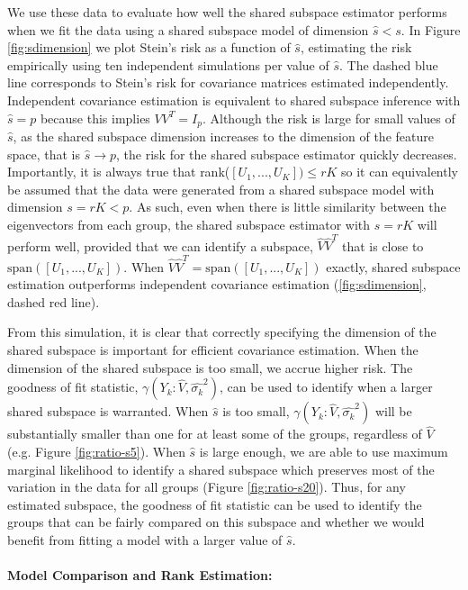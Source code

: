 \documentclass{statsoc}
\begin{document}
We use these data to evaluate how well the shared subspace estimator
performs when we fit the data using a shared subspace model of
dimension $\hat{s} < s$.  In Figure \ref{fig:sdimension} we plot
Stein's risk as a function of $\hat{s}$, estimating the risk
empirically using ten independent simulations per value of $\hat{s}$.
The dashed blue line corresponds to Stein's risk for covariance
matrices estimated independently.  Independent covariance estimation
is equivalent to shared subspace inference with $\hat{s} = p$ because
this implies $VV^T = I_p$.  Although the risk is large for small
values of $\hat{s}$, as the shared subspace dimension increases to the
dimension of the feature space, that is $\hat{s} \rightarrow p$, the
risk for the shared subspace estimator quickly decreases.
Importantly, it is always true that rank($[U_1, ..., U_K]) \leq rK$ so
it can equivalently be assumed that the data were generated from a
shared subspace model with dimension $s = rK < p$.  As such, even when
there is little similarity between the eigenvectors from each group,
the shared subspace estimator with $\hat{s} = rK$ will perform well,
provided that we can identify a subspace, $\hat{V}\hat{V}^T$ that is
close to $\text{span}([U_1, ..., U_K])$. When
$\hat{V}\hat{V}^T = \text{span}([U_1, ..., U_K])$ exactly, shared
subspace estimation outperforms independent covariance estimation
(\ref{fig:sdimension}, dashed red line).

From this simulation, it is clear that correctly specifying the
dimension of the shared subspace is important for efficient covariance
estimation.  When the dimension of the shared subspace is too small,
we accrue higher risk.  The goodness of fit statistic,
$\gamma(Y_k: \hat{V}, \hat{\sigma_k}^2)$, can be used to identify when
a larger shared subspace is warranted.  When $\hat{s}$ is too small,
$\gamma(Y_k: \hat{V}, \hat{\sigma_k}^2)$ will be substantially smaller
than one for at least some of the groups, regardless of $\hat{V}$
(e.g. Figure \ref{fig:ratio-s5}).  When $\hat{s}$ is large enough, we
are able to use maximum marginal likelihood to identify a shared
subspace which preserves most of the variation in the data for all
groups (Figure \ref{fig:ratio-s20}).  Thus, for any estimated
subspace, the goodness of fit statistic can be used to identify the
groups that can be fairly compared on this subspace and whether we
would benefit from fitting a model with a larger value of $\hat{s}$.

\paragraph{Model Comparison and Rank Estimation:}
\end{document}
